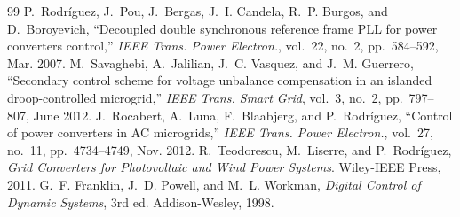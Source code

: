 \documentclass[10pt,a4paper]{scrartcl}
\begin{document}
\begin{onehalfspace}
\begin{thebibliography}{99}
 P.~Rodr\'iguez, J.~Pou, J.~Bergas, J.~I. Candela, R.~P. Burgos, and D.~Boroyevich, ``Decoupled double synchronous reference frame PLL for power converters control,'' \emph{IEEE Trans. Power Electron.}, vol.~22, no.~2, pp.~584--592, Mar. 2007.
 M.~Savaghebi, A.~Jalilian, J.~C. Vasquez, and J.~M. Guerrero, ``Secondary control scheme for voltage unbalance compensation in an islanded droop-controlled microgrid,'' \emph{IEEE Trans. Smart Grid}, vol.~3, no.~2, pp.~797--807, June 2012.
 J.~Rocabert, A.~Luna, F.~Blaabjerg, and P.~Rodr\'iguez, ``Control of power converters in AC microgrids,'' \emph{IEEE Trans. Power Electron.}, vol.~27, no.~11, pp.~4734--4749, Nov. 2012.
 R.~Teodorescu, M.~Liserre, and P.~Rodr\'iguez, \emph{Grid Converters for Photovoltaic and Wind Power Systems}. Wiley-IEEE Press, 2011.
 G.~F. Franklin, J.~D. Powell, and M.~L. Workman, \emph{Digital Control of Dynamic Systems}, 3rd ed. Addison-Wesley, 1998.
\end{thebibliography}

\end{onehalfspace}
\end{document}

